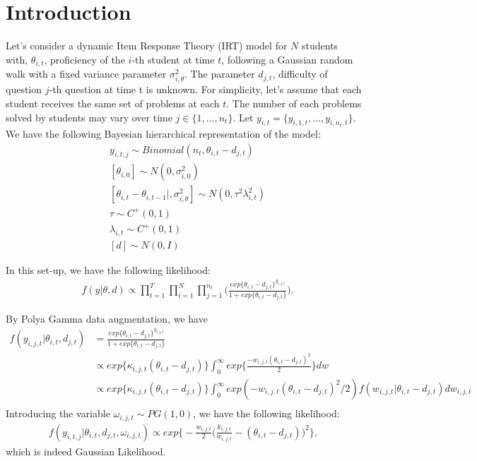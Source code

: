 \documentclass[12pt]{article}
\begin{document}
\section{Introduction}
Let's consider a dynamic Item Response Theory (IRT) model for $N$ students with, $\theta_{i,t}$, proficiency of the $i$-th student  at time $t$, following a Gaussian random walk with a fixed variance parameter $\sigma_{i,\theta}^2$. The parameter $d_{j,t}$, difficulty of question $j$-th question at time t is unknown. For simplicity, let's assume that each student receives the same set of problems at each $t$. The number of each problems solved by students may vary over time $j \in \{1,\ldots, n_t\}.$ Let $y_{i,t} = \{ y_{i,1,t},\ldots, y_{i,n_t,t}\}$. We have the following Bayesian hierarchical representation of the model:
\begin{align*}
	&y_{i,t,j} \sim Binomial(n_{t},\theta_{i,t} - d_{j,t}) \\
	&[\theta_{i,0}] \sim N(0,\sigma^2_{i,0})\\
	&[\theta_{i,t} - \theta_{i,t-1}|,\sigma^2_{i,\theta}] \sim N(0,\tau^2\lambda^2_{i,t})\\
	&\tau \sim C^{+}(0,1) \\
	&\lambda_{i,t} \sim C^{+}(0,1)\\
	&[d] \sim N(0, I)	
\end{align*}

In this set-up, we have the following likelihood:
\begin{align*}
	&f(y|\theta,d)  \propto \prod_{t=1}^{T}\prod_{i=1}^{N}\prod_{j=1}^{n_t} \bigg(\frac{exp\{\theta_{i,t} - d_{j,t}\}^{y_{i,j,t}}}{1+exp\{\theta_{i,t} - d_{j,t}\}}\bigg).
\end{align*}

By Polya Gamma data augmentation, we have
\begin{align*}
	f(y_{i,j,t}|\theta_{i,t},d_{j,t}) &=  \frac{exp\{\theta_{i,t} - d_{j,t}\}^{y_{i,j,t}}}{1+exp\{\theta_{i,t} - d_{j,t}\}}  \\
	&\propto exp\{\kappa_{i,j,t}(\theta_{i,t} - d_{j,t})\}\int_{0}^{\infty}exp\bigg\{\frac{-w_{i,j,t}(\theta_{i,t} - d_{j,t})^2}{2}\bigg\} dw \\
	&\propto  exp\{\kappa_{i,j,t}(\theta_{i,t} - d_{j,t})\}\int_{0}^{\infty} exp(-w_{i,j,t}(\theta_{i,t} - d_{j,t})^2/2)  f(w_{i,j,t}|\theta_{i,t}-d_{j,t}) dw_{i,j,t} \\
\end{align*}
Introducing the variable $\omega_{i,j,t} \sim PG(1,0)$, we have the following likelihood:
\begin{align*}
	f(y_{i,t,j}|\theta_{i,t},d_{j,t},\omega_{i,j,t}) \propto exp\bigg\{-\frac{w_{i,j,t}}{2}\bigg(\frac{k_{i,j,t}}{w_{i,j,t}}-(\theta_{i,t} - d_{j,t})\bigg)^2 \bigg\},
\end{align*}
which is indeed Gaussian Likelihood. 
\end{document}

